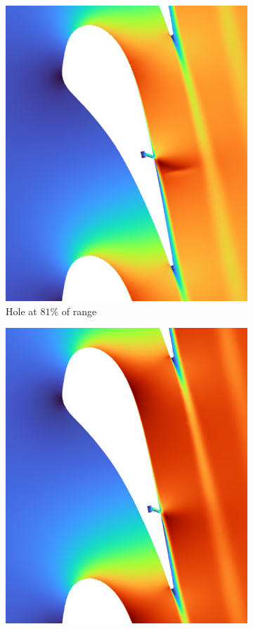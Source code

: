 \documentclass[a4paper, 11pt, oneside]{report}
\begin{document}
\begin{figure}[H]
\begin{subfigure}{.42\textwidth}
		\includegraphics[width=\linewidth]{figs/sch_mach_contours_5.png}
		\caption{Hole at $81\%$ of range}
		\vspace{0.018\textheight}
	\end{subfigure}
	\begin{subfigure}{.42\textwidth}
		\centering
		\includegraphics[width=\linewidth]{figs/sch_mach_contours_6.png}

\end{subfigure}
\end{figure}
\end{document}
